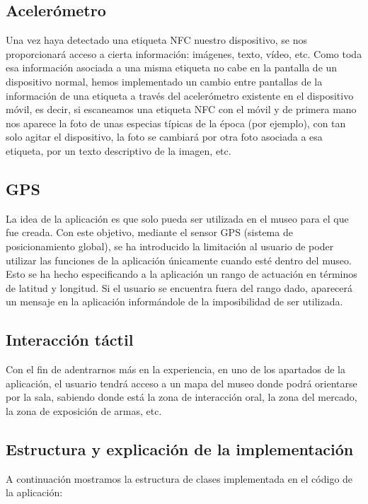 \subsection{Acelerómetro}
Una vez haya detectado una etiqueta NFC nuestro dispositivo, se nos proporcionará acceso a cierta información: imágenes, texto, vídeo, etc. Como toda esa información asociada a una misma etiqueta no cabe en la pantalla de
un dispositivo normal, hemos implementado un cambio entre pantallas de la información de una etiqueta a través del acelerómetro existente en el dispositivo móvil, es decir, si escaneamos una etiqueta NFC con el móvil y de primera mano nos aparece la foto de unas especias típicas de la época (por ejemplo), con tan solo agitar el dispositivo, la foto se cambiará por otra foto asociada a esa etiqueta, por un texto descriptivo de la imagen, etc.

\subsection{GPS}

La idea de la aplicación es que solo pueda ser utilizada en el museo para el que fue creada. Con este objetivo, mediante el sensor GPS (sistema de posicionamiento global), se ha introducido la limitación al usuario de poder utilizar las funciones de la aplicación únicamente cuando esté dentro del museo. Esto se ha hecho especificando a la aplicación un rango de actuación en términos de latitud y longitud. Si el usuario se encuentra fuera del rango dado, aparecerá un mensaje en la aplicación informándole de la imposibilidad de ser utilizada.

\subsection{Interacción táctil}

Con el fin de adentrarnos más en la experiencia, en uno de los apartados de la aplicación, el usuario tendrá acceso a un mapa del museo donde podrá orientarse por la sala, sabiendo donde está la zona de interacción oral, la zona del mercado, la zona de exposición de armas, etc.

\subsection{Estructura y explicación de la implementación}

A continuación mostramos la estructura de clases implementada en el código de la aplicación:

